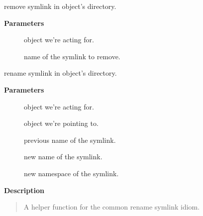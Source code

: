 \documentclass[a4paper,8pt,english]{sphinxmanual}
\begin{document}
\begin{fulllineitems}
\label{filesystems/index:c.sysfs_remove_link}
remove symlink in object's directory.

\end{fulllineitems}


\textbf{Parameters}
\begin{description}
\item[{}] \leavevmode
object we're acting for.

\item[{}] \leavevmode
name of the symlink to remove.

\end{description}

\begin{fulllineitems}
\label{filesystems/index:c.sysfs_rename_link_ns}
rename symlink in object's directory.

\end{fulllineitems}


\textbf{Parameters}
\begin{description}
\item[{}] \leavevmode
object we're acting for.

\item[{}] \leavevmode
object we're pointing to.

\item[{}] \leavevmode
previous name of the symlink.

\item[{}] \leavevmode
new name of the symlink.

\item[{}] \leavevmode
new namespace of the symlink.

\end{description}

\textbf{Description}
\begin{quote}

A helper function for the common rename symlink idiom.
\end{quote}
\end{document}
